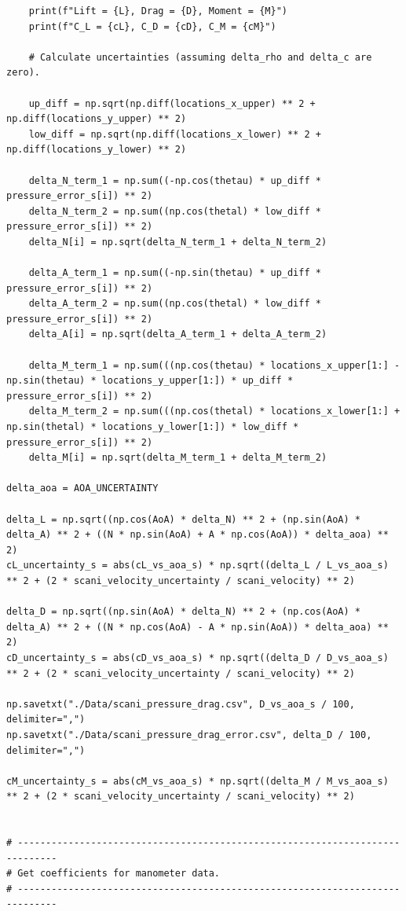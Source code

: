 \documentclass[runningheads]{llncs}
\begin{document}
\begin{verbatim}
    print(f"Lift = {L}, Drag = {D}, Moment = {M}")
    print(f"C_L = {cL}, C_D = {cD}, C_M = {cM}")

    # Calculate uncertainties (assuming delta_rho and delta_c are zero).

    up_diff = np.sqrt(np.diff(locations_x_upper) ** 2 + np.diff(locations_y_upper) ** 2)
    low_diff = np.sqrt(np.diff(locations_x_lower) ** 2 + np.diff(locations_y_lower) ** 2)

    delta_N_term_1 = np.sum((-np.cos(thetau) * up_diff * pressure_error_s[i]) ** 2)
    delta_N_term_2 = np.sum((np.cos(thetal) * low_diff * pressure_error_s[i]) ** 2)
    delta_N[i] = np.sqrt(delta_N_term_1 + delta_N_term_2)

    delta_A_term_1 = np.sum((-np.sin(thetau) * up_diff * pressure_error_s[i]) ** 2)
    delta_A_term_2 = np.sum((np.cos(thetal) * low_diff * pressure_error_s[i]) ** 2)
    delta_A[i] = np.sqrt(delta_A_term_1 + delta_A_term_2)

    delta_M_term_1 = np.sum(((np.cos(thetau) * locations_x_upper[1:] - np.sin(thetau) * locations_y_upper[1:]) * up_diff * pressure_error_s[i]) ** 2)
    delta_M_term_2 = np.sum(((np.cos(thetal) * locations_x_lower[1:] + np.sin(thetal) * locations_y_lower[1:]) * low_diff * pressure_error_s[i]) ** 2)
    delta_M[i] = np.sqrt(delta_M_term_1 + delta_M_term_2)

delta_aoa = AOA_UNCERTAINTY

delta_L = np.sqrt((np.cos(AoA) * delta_N) ** 2 + (np.sin(AoA) * delta_A) ** 2 + ((N * np.sin(AoA) + A * np.cos(AoA)) * delta_aoa) ** 2)
cL_uncertainty_s = abs(cL_vs_aoa_s) * np.sqrt((delta_L / L_vs_aoa_s) ** 2 + (2 * scani_velocity_uncertainty / scani_velocity) ** 2)

delta_D = np.sqrt((np.sin(AoA) * delta_N) ** 2 + (np.cos(AoA) * delta_A) ** 2 + ((N * np.cos(AoA) - A * np.sin(AoA)) * delta_aoa) ** 2)
cD_uncertainty_s = abs(cD_vs_aoa_s) * np.sqrt((delta_D / D_vs_aoa_s) ** 2 + (2 * scani_velocity_uncertainty / scani_velocity) ** 2)

np.savetxt("./Data/scani_pressure_drag.csv", D_vs_aoa_s / 100, delimiter=",")
np.savetxt("./Data/scani_pressure_drag_error.csv", delta_D / 100, delimiter=",")

cM_uncertainty_s = abs(cM_vs_aoa_s) * np.sqrt((delta_M / M_vs_aoa_s) ** 2 + (2 * scani_velocity_uncertainty / scani_velocity) ** 2)


# -----------------------------------------------------------------------------
# Get coefficients for manometer data.
# -----------------------------------------------------------------------------


\end{verbatim}
\end{document}
